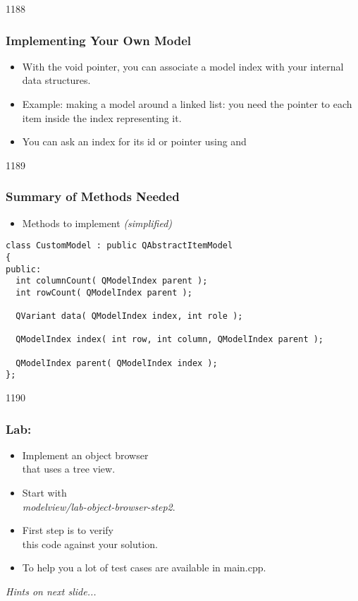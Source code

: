 \begin{slide}{1188}\frametitle{Implementing Your Own Model
   }\label{model_indexes_end}
\begin{itemize}
\item With the void pointer, you can associate a model index with your internal
  data structures.
\item Example: making a model around a linked list: you need the pointer to each
  item inside the index representing it.
\item You can ask an index for its id or pointer using
   and 
\end{itemize}
\end{slide}

\begin{slide}[fragile]{1189}
  \frametitle{Summary of Methods Needed}
  \begin{itemize}
  \item Methods to implement \textit{(simplified)}
  \end{itemize}
  \begin{lstlisting}
class CustomModel : public QAbstractItemModel
{
public:
  int columnCount( QModelIndex parent );
  int rowCount( QModelIndex parent );

  QVariant data( QModelIndex index, int role );

  QModelIndex index( int row, int column, QModelIndex parent );

  QModelIndex parent( QModelIndex index );
};
\end{lstlisting}
\end{slide}
  
\begin{slide}{1190}\frametitle{Lab: }
\begin{itemize}
\item Implement an object browser \\ that uses
  a tree view.
\item Start with \\
  \emph{modelview/lab-object-browser-step2}.
\item First step is to verify \\ this code
  against your solution.
\item To help you a lot of test cases are available in main.cpp.
\end{itemize}

\textit{Hints on next slide...}

\end{slide}

